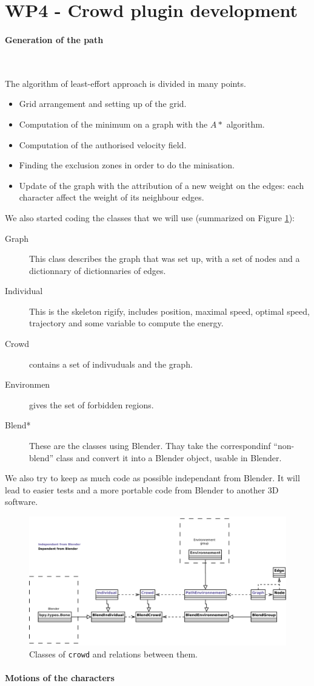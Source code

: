 \section{WP4 - Crowd plugin development}

\paragraph{Generation of the path}~

\noindent The algorithm of least-effort approach is divided in many points.
\begin{itemize}
  \item Grid arrangement and setting up of the grid.
  \item Computation of the minimum on a graph with the $A*$ algorithm.
  \item Computation of the authorised velocity field.
  \item Finding the exclusion zones in order to do the minisation.
  \item Update of the graph with the attribution of a new weight on the edges: each character affect the weight of its neighbour edges.
\end{itemize}

\noindent We also started coding the classes that we will use (summarized on Figure \ref{crowd_classes}):
\begin{description}
  \item[Graph] This class describes the graph that was set up, with a set of nodes and a dictionnary of dictionnaries of edges.
  \item[Individual] This is the skeleton rigify, includes position, maximal speed, optimal speed, trajectory and some variable to compute the energy.
  \item [Crowd] contains a set of indivuduals and the graph.
  \item[Environmen] gives the set of forbidden regions.
  \item[Blend*] These are the classes using Blender. Thay take the correspondinf ``non-blend'' class and convert it into a Blender object, usable in Blender. 
\end{description}

We also try to keep as much code as possible independant from Blender. It will lead to easier tests and a more portable code from Blender to another 3D software.

\begin{figure}[h]
  \includegraphics[width=15cm]{crowd_final.pdf}
  \caption{Classes of \texttt{crowd} and relations between them.}
  \label{crowd_classes}
\end{figure}

\paragraph{Motions of the characters}~
